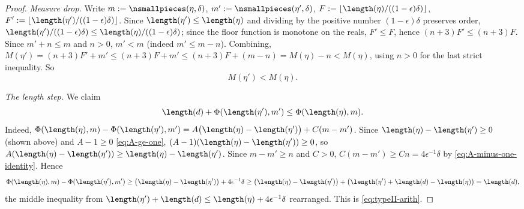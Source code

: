 \begin{proof}
  \emph{Measure drop.} Write $m:=\nsmallpieces(\eta,\delta)$, $m':=\nsmallpieces(\eta',\delta)$,
  $F:=\lfloor\length(\eta)/((1-\epsilon)\delta)\rfloor$, $F':=\lfloor\length(\eta')/((1-\epsilon)
  \delta)\rfloor$. Since $\length(\eta')\le\length(\eta)$ and dividing by the positive number
  $(1-\epsilon)\delta$ preserves order, $\length(\eta')/((1-\epsilon)\delta) \le
  \length(\eta)/((1-\epsilon)\delta)$; since the floor function is monotone on the reals,
  $F'\le F$, hence $(n+3)F' \le (n+3)F$. Since $m'+n\le m$ and $n>0$, $m' < m$ (indeed $m'\le m-n$).
  Combining, $M(\eta')=(n+3)F'+m' \le (n+3)F+m' \le (n+3)F+(m-n) = M(\eta)-n < M(\eta)$, using
  $n>0$ for the last strict inequality. So
  \begin{equation}
    \label{eq:typeII-measure-drop}
    M(\eta') < M(\eta)
    .
  \end{equation}

  \emph{The length step.} We claim
  \begin{equation}
    \label{eq:typeII-arith}
    \length(d) + \Phi(\length(\eta'),m') \le \Phi(\length(\eta),m)
    .
  \end{equation}
  Indeed, $\Phi(\length(\eta),m)-\Phi(\length(\eta'),m') = A\bigl(\length(\eta)-\length(\eta')\bigr)
  + C(m-m')$. Since $\length(\eta)-\length(\eta')\ge0$ (shown above) and $A-1\ge0$
  \eqref{eq:A-ge-one}, $(A-1)(\length(\eta)-\length(\eta'))\ge0$, so $A(\length(\eta)-\length(\eta'))
  \ge \length(\eta)-\length(\eta')$. Since $m-m'\ge n$ and $C>0$, $C(m-m')\ge Cn=4\epsilon^{-1}
  \delta$ by \eqref{eq:A-minus-one-identity}. Hence
  \[
    \Phi(\length(\eta),m)-\Phi(\length(\eta'),m') \ge \bigl(\length(\eta)-\length(\eta')\bigr) +
    4\epsilon^{-1}\delta \ge \bigl(\length(\eta)-\length(\eta')\bigr) +
    \bigl(\length(\eta')+\length(d)-\length(\eta)\bigr) = \length(d)
    ,
  \]
  the middle inequality from $\length(\eta')+\length(d)\le\length(\eta)+4\epsilon^{-1}\delta$
  rearranged. This is \eqref{eq:typeII-arith}.


\end{proof}
